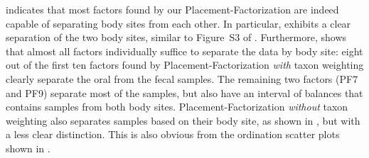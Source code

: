  indicates that most factors found by our Placement-Factorization
are indeed capable of separating body sites from each other.
In particular, 
exhibits a clear separation of the two body sites, similar to Figure~S3 of .
Furthermore, 
shows that almost all factors individually suffice to separate the data by body site:
eight out of the first ten factors found by Placement-Factorization \emph{with} taxon weighting
clearly separate the oral from the fecal samples.
The remaining two factors (PF7 and PF9) separate most of the samples,
but also have an interval of balances that contains samples from both body sites.
Placement-Factorization \emph{without} taxon weighting also separates samples based on their body site,
as shown in ,
but with a less clear distinction.
This is also obvious from the ordination scatter plots
shown in .



